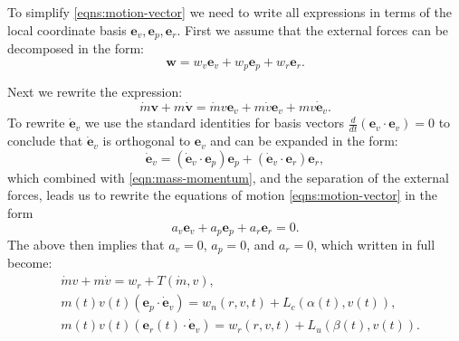 \documentclass{article}
\renewcommand{\vec}[1]{\boldsymbol{#1}}
\begin{document}
To simplify \eqref{eqns:motion-vector} we need to write all expressions in terms of the local coordinate basis $\vec e_v, \vec e_p, \vec e_r$. First we assume that the external forces can be decomposed in the form:
\[
\vec w = w_v \vec e_v + w_p \vec e_p + w_r \vec e_r.
\]

Next we rewrite the expression:
\begin{equation} \label{eqn:mass-momentum}
    \dot{m}\vec{v} + m \dot{\vec{v}} = \dot{m}v \vec{e}_v + m \dot v \vec{e}_v + m v \dot{\vec{e}}_v.
\end{equation}
To rewrite $\dot{\vec{e}}_v$ we use the standard identities for basis vectors $\frac{d}{dt}(\vec{e}_v \cdot \vec{e}_v)=0$
to conclude that $\dot{\vec{e}}_v$ is orthogonal to ${\vec{e}}_v$ and can be expanded in the form:
\[
\dot{\vec{e}}_v =  (\dot{\vec{e}}_v \cdot \vec{e}_p)\vec{e}_p + (\dot{\vec{e}}_v \cdot \vec{e}_r)\vec{e}_r,
\] 
which combined with \eqref{eqn:mass-momentum}, and the separation of the external forces, leads us to rewrite the equations of motion \eqref{eqns:motion-vector} in the form 
\[ 
a_v \vec e_v + a_p \vec e_p + a_r \vec e_r = 0.
\]
The above then implies that $a_v =0$, $a_p =0$, and $a_r =0$, which written in full become:
\begin{align} \label{eqn:thrust-momentum}
    &  \dot{m} v + m \dot v = w_r + T(\dot{m},v),
    \\
    \label{eqn:turn-momentum}
    &  m(t) v(t)({\vec{e}}_p \cdot \dot{\vec{e}}_v) = w_n(r,v,t) + L_c(\alpha(t),v(t)),
    \\
    \label{eqn:lift-momentum}
    & m(t) v(t)({\vec{e}_r}(t) \cdot \dot{\vec{e}}_v)=w_r(r,v,t)+L_u(\beta(t),v(t)).
\end{align}
\end{document}
